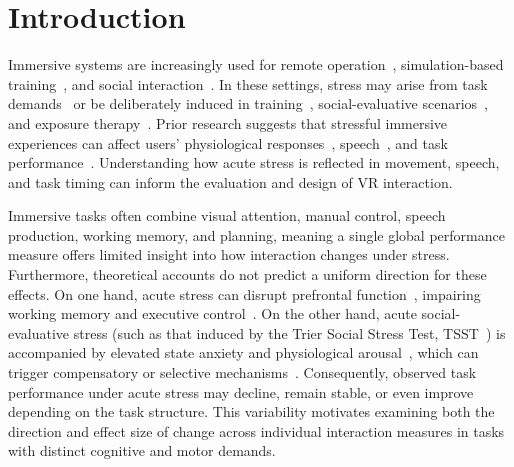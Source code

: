 \section{Introduction}
Immersive systems are increasingly used for remote operation~\citep{haidegger2011surgery}, simulation-based training~\citep{radianti2020systematic}, and social interaction~\citep{li2021social,wei2022communication}. In these settings, stress may arise from task demands~\citep{arora2010stress} or be deliberately induced in training~\citep{kleygrewe2024virtual}, social-evaluative scenarios~\citep{helminen2019metaanalysis}, and exposure therapy~\citep{carl2019virtual}. Prior research suggests that stressful immersive experiences can affect users' physiological responses~\citep{vandammen2022evoking}, speech~\citep{dillon2021real}, and task performance~\citep{peterson2018effects}. Understanding how acute stress is reflected in movement, speech, and task timing can inform the evaluation and design of VR interaction.

Immersive tasks often combine visual attention, manual control, speech production, working memory, and planning, meaning a single global performance measure offers limited insight into how interaction changes under stress. Furthermore, theoretical accounts do not predict a uniform direction for these effects. On one hand, acute stress can disrupt prefrontal function~\citep{arnsten2009stress,qin2009acute}, impairing working memory and executive control~\citep{shields2016effects}. On the other hand, acute social-evaluative stress (such as that induced by the Trier Social Stress Test, TSST~\citep{kirschbaum1993trier}) is accompanied by elevated state anxiety and physiological arousal~\citep{allen2014biological}, which can trigger compensatory or selective mechanisms~\citep{eysenck2007anxiety,easterbrook1959effect}. Consequently, observed task performance under acute stress may decline, remain stable, or even improve depending on the task structure. This variability motivates examining both the direction and effect size of change across individual interaction measures in tasks with distinct cognitive and motor demands.


